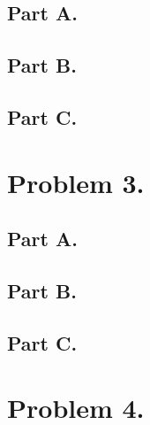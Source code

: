 \documentclass{article}
\begin{document}
\subsection*{Part A.}


\subsection*{Part B.}



\subsection*{Part C.}

\clearpage
\section*{Problem 3.}

\subsection*{Part A.}

\subsection*{Part B.}

\subsection*{Part C.}

\clearpage
\section*{Problem 4.}


\clearpage
\end{document}
